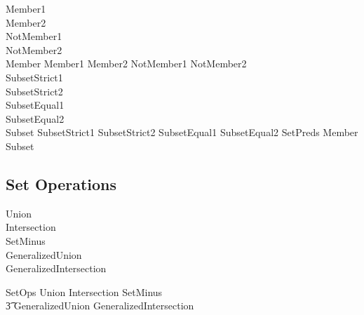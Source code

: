 \documentclass{article}
\begin{document}
\begin{zed}
  Member1 \\
  Member2 \\
  NotMember1 \\
  NotMember2 \\
  Member  Member1 \land Member2 \land NotMember1 \land NotMember2\\
  \also
  SubsetStrict1 \\
  SubsetStrict2 \\
  SubsetEqual1 \\
  SubsetEqual2 \\  
  Subset  SubsetStrict1 \land SubsetStrict2 \land SubsetEqual1 \land SubsetEqual2
  \also
  SetPreds  Member \land Subset
\end{zed}

\subsection{Set Operations}

\begin{zed}    
  Union \\
  Intersection \\
  SetMinus \\
  GeneralizedUnion \\
  GeneralizedIntersection \\
\end{zed}

\begin{zed}
  SetOps  Union \land Intersection \land SetMinus \land \\
  \t3 GeneralizedUnion \land GeneralizedIntersection
\end{zed}
\end{document}
